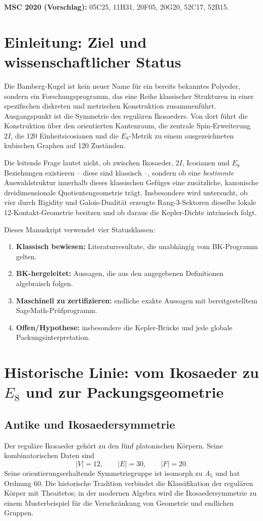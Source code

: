 \documentclass[11pt,a4paper]{article}
\theoremstyle{definition}
\theoremstyle{remark}
\begin{document}
\textbf{MSC 2020 (Vorschlag):} 05C25, 11H31, 20F05, 20G20, 52C17, 52B15.

\tableofcontents

\section{Einleitung: Ziel und wissenschaftlicher Status}
Die Bamberg-Kugel ist kein neuer Name für ein bereits bekanntes Polyeder, sondern ein Forschungsprogramm, das eine Reihe klassischer Strukturen in einer spezifischen diskreten und metrischen Konstruktion zusammenführt. Ausgangspunkt ist die Symmetrie des regulären Ikosaeders. Von dort führt die Konstruktion über den orientierten Kantenraum, die zentrale Spin-Erweiterung $2I$, die 120 Einheitsicosianen und die $E_8$-Metrik zu einem ausgezeichneten kubischen Graphen auf 120 Zuständen.

Die leitende Frage lautet nicht, ob zwischen Ikosaeder, $2I$, Icosianen und $E_8$ Beziehungen existieren -- diese sind klassisch --, sondern ob eine \emph{bestimmte} Auswahlstruktur innerhalb dieses klassischen Gefüges eine zusätzliche, kanonische dreidimensionale Quotientengeometrie trägt. Insbesondere wird untersucht, ob vier durch Rigidity und Galois-Dualität erzeugte Rang-3-Sektoren dieselbe lokale 12-Kontakt-Geometrie besitzen und ob daraus die Kepler-Dichte intrinsisch folgt.

Dieses Manuskript verwendet vier Statusklassen:
\begin{enumerate}[label=\textbf{S\arabic*:}]
\item \textbf{Klassisch bewiesen:} Literaturresultate, die unabhängig vom BK-Programm gelten.
\item \textbf{BK-hergeleitet:} Aussagen, die aus den angegebenen Definitionen algebraisch folgen.
\item \textbf{Maschinell zu zertifizieren:} endliche exakte Aussagen mit bereitgestelltem SageMath-Prüfprogramm.
\item \textbf{Offen/Hypothese:} insbesondere die Kepler-Brücke und jede globale Packungsinterpretation.
\end{enumerate}

\section{Historische Linie: vom Ikosaeder zu $E_8$ und zur Packungsgeometrie}
\subsection{Antike und Ikosaedersymmetrie}
Der reguläre Ikosaeder gehört zu den fünf platonischen Körpern. Seine kombinatorischen Daten sind
\[
|V|=12,\qquad |E|=30,\qquad |F|=20.
\]
Seine orientierungserhaltende Symmetriegruppe ist isomorph zu $A_5$ und hat Ordnung $60$. Die historische Tradition verbindet die Klassifikation der regulären Körper mit Theaitetos; in der modernen Algebra wird die Ikosaedersymmetrie zu einem Musterbeispiel für die Verschränkung von Geometrie und endlichen Gruppen.
\end{document}
